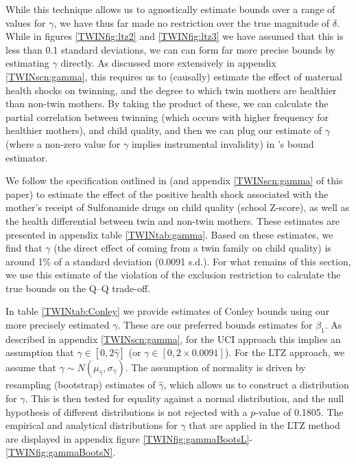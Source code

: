 \documentclass[subeqn]{article}
\begin{document}
\begin{spacing}{1.4}
While this technique allows us to agnostically estimate bounds over a range 
of values for $\gamma$, we have thus far made no restriction over the true 
magnitude of $\delta$.  While in figures \ref{TWINfig:ltz2} and 
\ref{TWINfig:ltz3} we have assumed that this is less than 0.1 standard 
deviations, we can can form far more precise bounds by estimating $\gamma$ 
directly.  As discussed more extensively in appendix \ref{TWINscn:gamma}, this 
requires us to (causally) estimate the effect of maternal health shocks on 
twinning, and the degree to which twin mothers are healthier than non-twin
mothers.  By taking the product of these, we can calculate the partial 
correlation between twinning (which occurs with higher frequency for healthier 
mothers), and child quality, and then we can plug our estimate of $\gamma$ 
(where a non-zero value for $\gamma$ implies instrumental invalidity) in 
\citeauthor{Conleyetal2012}'s bound estimator.

We follow the specification outlined in \citet{BhalotraVenkataramani2014}
(and appendix \ref{TWINscn:gamma} of this paper) to estimate the effect of 
the positive health shock associated with the mother's receipt of Sulfonamide 
drugs on child quality (school Z-score), as well as the health differential
between twin and non-twin mothers.  These estimates are presented in appendix 
table \ref{TWINtab:gamma}.  Based on these estimates, we find that $\gamma$
(the direct effect of coming from a twin family on child quality) is around
1\% of a standard deviation (0.0091 s.d.).  For what remains of this section, 
we use this estimate of the violation of the exclusion restriction to 
calculate the true bounds on the Q--Q trade-off.

In table \ref{TWINtab:Conley} we provide estimates of Conley bounds using 
our more precisely estimated $\gamma$.  These are our preferred bounds 
estimates for $\beta_1$.  As described in appendix \ref{TWINscn:gamma}, for 
the UCI approach this implies an assumption that $\gamma \in [0,2\hat\gamma]$
(or $\gamma \in [0,2\times 0.0091]$).  For the LTZ approach, we assume that 
$\gamma\sim N(\mu_{\hat\gamma},\sigma_{\hat\gamma})$.  The assumption of 
normality is driven by resampling (bootstrap) estimates of $\hat\gamma$,
which allows us to construct a distribution for $\gamma$.  This is then
tested for equality against a normal distribution, and the null hypothesis
of different distributions is not rejected with a $p$-value of 0.1805.  The 
empirical and analytical distributions for $\gamma$ that are applied in the 
LTZ method are displayed in appendix figure \ref{TWINfig:gammaBootsL}-%
\ref{TWINfig:gammaBootsN}.


\end{spacing}
\end{document}
